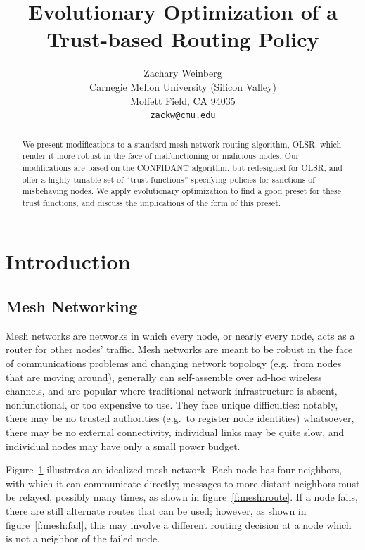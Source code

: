 \documentclass{article}
\title{Evolutionary Optimization of a Trust-based Routing Policy}
\author{
Zachary Weinberg \\
Carnegie Mellon University (Silicon Valley) \\
Moffett Field, CA 94035 \\
\texttt{zackw@cmu.edu} \\
}
\begin{document}
\maketitle

\begin{abstract}
We present modifications to a standard mesh network routing algorithm,
OLSR, which render it more robust in the face of malfunctioning or
malicious nodes.  Our modifications are based on the CONFIDANT
algorithm, but redesigned for OLSR, and offer a highly tunable set of
“trust functions” specifying policies for sanctions of misbehaving
nodes.  We apply evolutionary optimization to find a good preset for
these trust functions, and discuss the implications of the form of
this preset.
\end{abstract}

\section{Introduction}

\begin{figure}[b]
\label{f:mesh}
\end{figure}

\subsection{Mesh Networking}

Mesh networks are networks in which every node, or nearly every node,
acts as a router for other nodes' traffic.  Mesh networks are meant to
be robust in the face of communications problems and changing network
topology (e.g.\ from nodes that are moving around), generally can
self-assemble over ad-hoc wireless channels, and are popular where
traditional network infrastructure is absent, nonfunctional, or too
expensive to use.  They face unique difficulties: notably, there may
be no trusted authorities (e.g.\ to register node identities)
whatsoever, there may be no external connectivity, individual links
may be quite slow, and individual nodes may have only a small power
budget.

Figure~\ref{f:mesh} illustrates an idealized mesh network. Each node
has four neighbors, with which it can communicate directly; messages
to more distant neighbors must be relayed, possibly many times, as
shown in figure~\ref{f:mesh:route}.  If a node fails, there are still
alternate routes that can be used; however, as shown in
figure~\ref{f:mesh:fail}, this may involve a different routing
decision at a node which is not a neighbor of the failed node.
\end{document}
